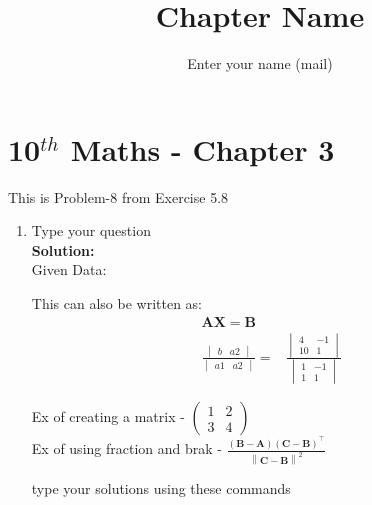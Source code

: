 \documentclass[12pt]{article}
\title{Chapter Name}
\author{Enter your name (mail)}
\newcommand{\myvec}[1]{\ensuremath{\begin{pmatrix}#1\end{pmatrix}}}
\newcommand{\mydet}[1]{\ensuremath{\begin{vmatrix}#1\end{vmatrix}}}
\newcommand{\solution}{\noindent \textbf{Solution: }}
\providecommand{\brak}[1]{\ensuremath{\left(#1\right)}}
\providecommand{\norm}[1]{\left\lVert#1\right\rVert}
\let\vec\mathbf
\begin{document}
\maketitle
\section*{10$^{th}$ Maths - Chapter 3}
This is Problem-8 from Exercise 5.8
\begin{enumerate}
\item Type your question \\
\solution \\
Given Data:

This can also be written as:
\begin{align}
\vec{AX}=\vec{B} \\
\frac{\mydet{ b & a2}}{\mydet{ a1 & a2}} =&
\frac{\mydet{ 4 & -1 \\ 10 & 1}}{\mydet{1&-1\\1&1}}
\end{align}

Ex of creating a matrix - $\myvec{1&2\\3&4}$\\
Ex of using fraction and brak - $\frac{\brak{\vec{B}-\vec{A}}\brak{\vec{C}-\vec{B}}^{\top}}{\norm{\vec{C-B}}^2}$

type your solutions using these commands
	

\end{enumerate}
\end{document}
